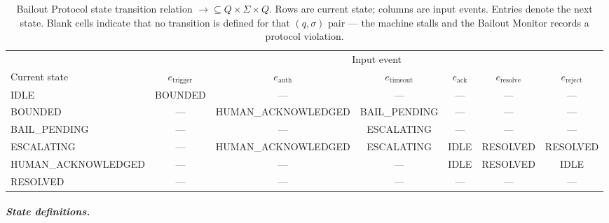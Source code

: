 \begin{table}[htbp]
\caption{Bailout Protocol state transition relation $\rightarrow \subseteq Q \times \Sigma \times Q$. Rows are current state; columns are input events. Entries denote the next state. Blank cells indicate that no transition is defined for that $(q, \sigma)$ pair — the machine stalls and the Bailout Monitor records a protocol violation.}
\label{tab:transition-relation}
\begin{tabular}{@{}lcccccc@{}}
\toprule
 & \multicolumn{6}{c}{Input event} \\
\cmidrule(l){2-7}
Current state & $e_{\text{trigger}}$ & $e_{\text{auth}}$ & $e_{\text{timeout}}$ & $e_{\text{ack}}$ & $e_{\text{resolve}}$ & $e_{\text{reject}}$ \\
\midrule
IDLE & BOUNDED & — & — & — & — & — \\
BOUNDED & — & HUMAN\_ACKNOWLEDGED & BAIL\_PENDING & — & — & — \\
BAIL\_PENDING & — & — & ESCALATING & — & — & — \\
ESCALATING & — & HUMAN\_ACKNOWLEDGED & ESCALATING & IDLE & RESOLVED & RESOLVED \\
HUMAN\_ACKNOWLEDGED & — & — & — & IDLE & RESOLVED & IDLE \\
RESOLVED & — & — & — & — & — & — \\
\bottomrule
\end{tabular}
\end{table}

\subparagraph{State definitions.}

